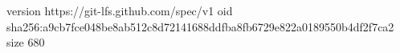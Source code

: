 version https://git-lfs.github.com/spec/v1
oid sha256:a9cb7fce048be8ab512c8d72141688ddfba8fb6729e822a0189550b4df2f7ca2
size 680
